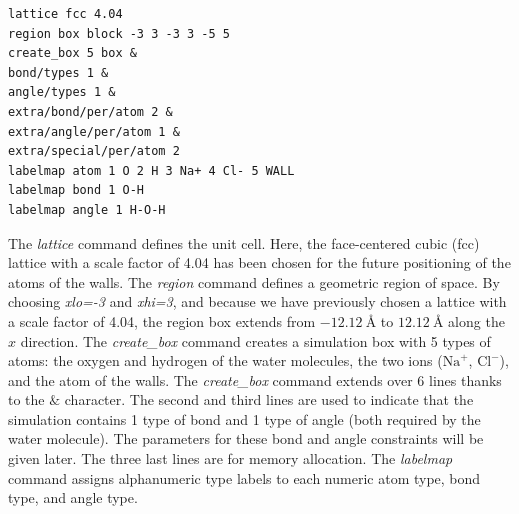 \documentclass[9pt,tutorial]{livecoms}
\begin{document}
{\normalsize \begin{verbatim}
lattice fcc 4.04
region box block -3 3 -3 3 -5 5
create_box 5 box &
bond/types 1 &
angle/types 1 &
extra/bond/per/atom 2 &
extra/angle/per/atom 1 &
extra/special/per/atom 2
labelmap atom 1 O 2 H 3 Na+ 4 Cl- 5 WALL
labelmap bond 1 O-H
labelmap angle 1 H-O-H
\end{verbatim}}
The \textit{lattice} command defines the unit cell. Here, the face-centered cubic (fcc) lattice
with a scale factor of 4.04 has been chosen for the future positioning of the atoms
of the walls. The \textit{region} command defines a geometric region of space. By choosing
\textit{xlo=-3} and \textit{xhi=3}, and because we have previously chosen a lattice with a scale
factor of 4.04, the region box extends from $-12.12~\text{\AA{}}$ to $12.12~\text{\AA{}}$
along the $x$ direction. The \textit{create\_box} command creates a simulation box with
5 types of atoms: the oxygen and hydrogen of the water molecules, the two ions ($\text{Na}^+$,
$\text{Cl}^-$), and the atom of the walls. The \textit{create\_box} command extends over 6
lines thanks to the $\&$ character. The second and third lines are used to indicate that the
simulation contains 1 type of bond and 1 type of angle (both required by the water molecule).
The parameters for these bond and angle constraints will be given later. The three last
lines are for memory allocation. The \textit{labelmap} command assigns alphanumeric type labels
to each numeric atom type, bond type, and angle type.
\end{document}
